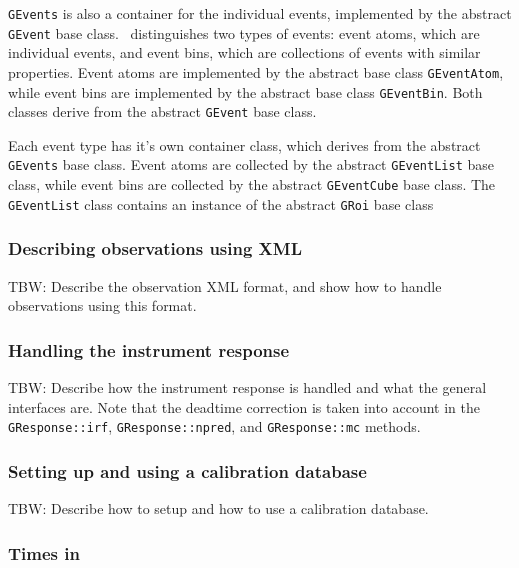 \documentclass{article}[12pt,a4]
\begin{document}
{\tt GEvents} is also a container for the individual events, implemented by the abstract 
{\tt GEvent} base class.
\this\ distinguishes two types of events:
event atoms, which are individual events, and
event bins, which are collections of events with similar properties.
Event atoms are implemented by the abstract base class {\tt GEventAtom}, while event bins
are implemented by the abstract base class {\tt GEventBin}.
Both classes derive from the abstract {\tt GEvent} base class.

Each event type has it's own container class, which derives from the abstract {\tt GEvents}
base class.
Event atoms are collected by the abstract {\tt GEventList} base class, while event bins are
collected by the abstract {\tt GEventCube} base class.
The {\tt GEventList} class contains an instance of the abstract {\tt GRoi} base class

\subsubsection{Describing observations using XML}
\label{sec:obsxml}

TBW: Describe the observation XML format, and show how to handle observations using this
format.


\subsubsection{Handling the instrument response}
\label{sec:response}

TBW: Describe how the instrument response is handled and what the general interfaces are.
Note that the deadtime correction is taken into account in the
{\tt GResponse::irf}, 
{\tt GResponse::npred}, and
{\tt GResponse::mc} methods.


\subsubsection{Setting up and using a calibration database}
\label{sec:caldb}

TBW: Describe how to setup and how to use a calibration database.


\subsubsection{Times in \this}
\label{sec:time}
\end{document}
